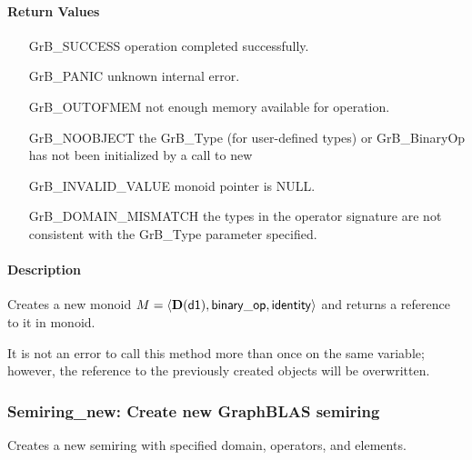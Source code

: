 \paragraph{Return Values}

\begin{itemize}[leftmargin=2.1in]
\item[{\sf GrB\_SUCCESS}]           operation completed successfully.
\item[{\sf GrB\_PANIC}]             unknown internal error.
\item[{\sf GrB\_OUTOFMEM}]          not enough memory available for operation.
\item[{\sf GrB\_NOOBJECT}]          the {\sf GrB\_Type} (for user-defined types)
                                    or {\sf GrB\_BinaryOp} has not been
                                    initialized by a call to {\sf new}
\item[{\sf GrB\_INVALID\_VALUE}]    {\sf monoid} pointer is {\sf NULL}.
\item[{\sf GrB\_DOMAIN\_MISMATCH}]  the types in the operator signature are not   
                                    consistent with the {\sf GrB\_Type} parameter specified.
\end{itemize}

\paragraph{Description}

Creates a new monoid $M = \langle \bold{D}({\sf d1}), {\sf binary\_op}, 
{\sf identity} \rangle$ and returns a reference to it in {\sf monoid}.

It is not an error to call this method more than once on the same variable;  
however, the reference to the previously created objects will be overwritten. 

\subsubsection{{\sf Semiring\_new}: Create new GraphBLAS semiring}

Creates a new semiring with specified domain, operators, and elements.

\paragraph{\syntax}

